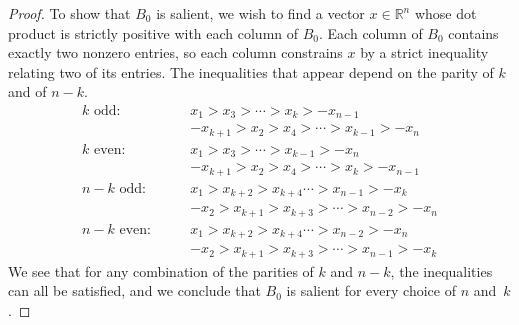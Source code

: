 \documentclass[10pt]{article}
\theoremstyle{definition}
\theoremstyle{remark}
\numberwithin{equation}{section}
\newcommand{\reals}{\mathbb R}
\newcommand{\0}{{\mathbf{0}}}
\begin{document}
\begin{proof}
To show that $B_0$ is salient, we wish to find a vector $x\in\reals^n$ whose dot product is strictly positive with each column of $B_0$.
Each column of $B_0$ contains exactly two nonzero entries, so each column constrains $x$ by a strict inequality relating two of its entries.
The inequalities that appear depend on the parity of $k$ and of $n-k$.
\begin{align*}
k\text{ odd:}\qquad
&x_1>x_3>\cdots>x_k>-x_{n-1}\\
&-x_{k+1}>x_2>x_4>\cdots>x_{k-1}>-x_n\\
k\text{ even:}\qquad
&x_1>x_3>\cdots>x_{k-1}>-x_n\\
&-x_{k+1}>x_2>x_4>\cdots>x_k>-x_{n-1}\\
n-k\text{ odd:}\qquad
&x_1>x_{k+2}>x_{k+4}\cdots>x_{n-1}>-x_k\\
&-x_2>x_{k+1}>x_{k+3}>\cdots>x_{n-2}>-x_n\\
n-k\text{ even:}\qquad
&x_1>x_{k+2}>x_{k+4}\cdots>x_{n-2}>-x_n\\
&-x_2>x_{k+1}>x_{k+3}>\cdots>x_{n-1}>-x_k
\end{align*}
We see that for any combination of the parities of $k$ and $n-k$, the inequalities can all be satisfied, and we conclude that $B_0$ is salient for every choice of $n$ and~$k$.
%
\end{proof}




\end{document}
